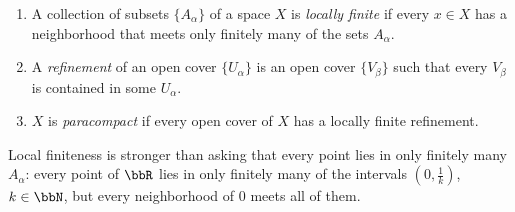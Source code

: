 \begin{defn}[Paracompactness]
    \begin{enumerate}
        \item A collection of subsets $\{A_\alpha\}$ of a space $X$ is \emph{locally finite} if every $x\in X$ has a neighborhood that meets only finitely many of the sets $A_\alpha$.
        \item A \emph{refinement} of an open cover $\{U_\alpha\}$ is an open cover $\{V_\beta\}$ such that every $V_\beta$ is contained in some $U_\alpha$.
        \item $X$ is \emph{paracompact} if every open cover of $X$ has a locally finite refinement.
    \end{enumerate}
\end{defn}
Local finiteness is stronger than asking that every point lies in only finitely many $A_\alpha$: every point of $\bbR$ lies in only finitely many of the intervals $(0,\frac1k)$, $k\in\bbN$, but every neighborhood of $0$ meets all of them.

